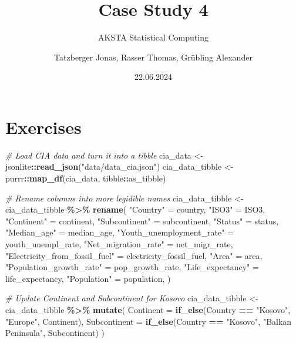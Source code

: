 \documentclass[
]{article}
\title{Case Study 4}
\subtitle{AKSTA Statistical Computing}
\author{Tatzberger Jonas, Rasser Thomas, Grübling Alexander}
\date{22.06.2024}
\newenvironment{Shaded}{\begin{snugshade}}{\end{snugshade}}
\newcommand{\AttributeTok}[1]{\textcolor[rgb]{0.13,0.29,0.53}{#1}}
\newcommand{\CommentTok}[1]{\textcolor[rgb]{0.56,0.35,0.01}{\textit{#1}}}
\newcommand{\FunctionTok}[1]{\textcolor[rgb]{0.13,0.29,0.53}{\textbf{#1}}}
\newcommand{\NormalTok}[1]{#1}
\newcommand{\OtherTok}[1]{\textcolor[rgb]{0.56,0.35,0.01}{#1}}
\newcommand{\SpecialCharTok}[1]{\textcolor[rgb]{0.81,0.36,0.00}{\textbf{#1}}}
\newcommand{\StringTok}[1]{\textcolor[rgb]{0.31,0.60,0.02}{#1}}
\begin{document}
\maketitle

\section{Exercises}\label{exercises}

\begin{Shaded}
\begin{Highlighting}[]
\CommentTok{\# Load CIA data and turn it into a tibble}
\NormalTok{cia\_data }\OtherTok{\textless{}{-}}\NormalTok{ jsonlite}\SpecialCharTok{::}\FunctionTok{read\_json}\NormalTok{(}\StringTok{"data/data\_cia.json"}\NormalTok{)}
\NormalTok{cia\_data\_tibble }\OtherTok{\textless{}{-}}\NormalTok{ purrr}\SpecialCharTok{::}\FunctionTok{map\_df}\NormalTok{(cia\_data, tibble}\SpecialCharTok{::}\NormalTok{as\_tibble)}

\CommentTok{\# Rename columns into more legidible names}
\NormalTok{cia\_data\_tibble }\OtherTok{\textless{}{-}}\NormalTok{ cia\_data\_tibble }\SpecialCharTok{\%\textgreater{}\%}
  \FunctionTok{rename}\NormalTok{(}
    \StringTok{"Country"} \OtherTok{=}\NormalTok{ country,}
    \StringTok{"ISO3"} \OtherTok{=}\NormalTok{ ISO3,}
    \StringTok{"Continent"} \OtherTok{=}\NormalTok{ continent,}
    \StringTok{"Subcontinent"} \OtherTok{=}\NormalTok{ subcontinent,}
    \StringTok{"Status"} \OtherTok{=}\NormalTok{ status,}
    \StringTok{"Median\_age"} \OtherTok{=}\NormalTok{ median\_age,}
    \StringTok{"Youth\_unemployment\_rate"} \OtherTok{=}\NormalTok{ youth\_unempl\_rate,}
    \StringTok{"Net\_migration\_rate"} \OtherTok{=}\NormalTok{ net\_migr\_rate,}
    \StringTok{"Electricity\_from\_fossil\_fuel"} \OtherTok{=}\NormalTok{ electricity\_fossil\_fuel,}
    \StringTok{"Area"} \OtherTok{=}\NormalTok{ area,}
    \StringTok{"Population\_growth\_rate"} \OtherTok{=}\NormalTok{ pop\_growth\_rate,}
    \StringTok{"Life\_expectancy"} \OtherTok{=}\NormalTok{ life\_expectancy,}
    \StringTok{"Population"} \OtherTok{=}\NormalTok{ population,}
\NormalTok{  )}

\CommentTok{\# Update Continent and Subcontinent for Kosovo}
\NormalTok{cia\_data\_tibble }\OtherTok{\textless{}{-}}\NormalTok{ cia\_data\_tibble }\SpecialCharTok{\%\textgreater{}\%}
  \FunctionTok{mutate}\NormalTok{(}
    \AttributeTok{Continent =} \FunctionTok{if\_else}\NormalTok{(Country }\SpecialCharTok{==} \StringTok{"Kosovo"}\NormalTok{, }\StringTok{"Europe"}\NormalTok{, Continent),}
    \AttributeTok{Subcontinent =} \FunctionTok{if\_else}\NormalTok{(Country }\SpecialCharTok{==} \StringTok{"Kosovo"}\NormalTok{, }\StringTok{"Balkan Peninsula"}\NormalTok{, Subcontinent)}
\NormalTok{  )}


\end{Highlighting}
\end{Shaded}
\end{document}
